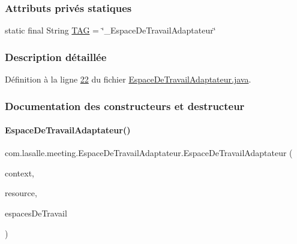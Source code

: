 \subsubsection*{Attributs privés statiques}
\begin{DoxyCompactItemize}
\item 
static final String \hyperlink{classcom_1_1lasalle_1_1meeting_1_1_espace_de_travail_adaptateur_a6d9fb5167546f9b1da395ca3ce3a577f}{T\+AG} = \char`\"{}\+\_\+\+Espace\+De\+Travail\+Adaptateur\char`\"{}
\end{DoxyCompactItemize}


\subsubsection{Description détaillée}


Définition à la ligne \hyperlink{_espace_de_travail_adaptateur_8java_source_l00022}{22} du fichier \hyperlink{_espace_de_travail_adaptateur_8java_source}{Espace\+De\+Travail\+Adaptateur.\+java}.



\subsubsection{Documentation des constructeurs et destructeur}
\mbox{\label{classcom_1_1lasalle_1_1meeting_1_1_espace_de_travail_adaptateur_a236d4cbea7b551e4faf638b578c1f980}} 
\paragraph{\texorpdfstring{Espace\+De\+Travail\+Adaptateur()}{EspaceDeTravailAdaptateur()}}
{\footnotesize\ttfamily com.\+lasalle.\+meeting.\+Espace\+De\+Travail\+Adaptateur.\+Espace\+De\+Travail\+Adaptateur (\begin{DoxyParamCaption}\item[{Context}]{context,  }\item[{int}]{resource,  }\item[{Vector$<$ \hyperlink{classcom_1_1lasalle_1_1meeting_1_1_espace_de_travail}{Espace\+De\+Travail} $>$}]{espaces\+De\+Travail }\end{DoxyParamCaption})}



